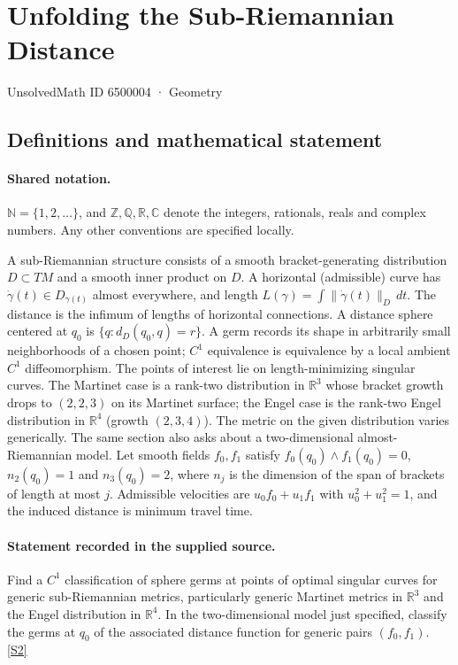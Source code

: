 \documentclass[11pt]{article}
\newcommand{\sref}[2]{\hyperlink{source:#1:#2}{[S#2]}}
\begin{document}
\setcounter{section}{6500003}
\section{Unfolding the Sub-Riemannian Distance}\label{6500004}
{\small\sffamily UnsolvedMath ID 6500004 · Geometry}
\subsection{Definitions and mathematical statement}

\paragraph{Shared notation.}$\mathbb N=\{1,2,\ldots\}$, and $\mathbb Z,\mathbb Q,\mathbb R,\mathbb C$ denote the integers, rationals, reals and complex numbers. Any other conventions are specified locally.


A sub-Riemannian structure consists of a smooth bracket-generating distribution $D\subset TM$ and a smooth inner product on $D$. A horizontal (admissible) curve has $\dot\gamma(t)\in D_{\gamma(t)}$ almost everywhere, and length $L(\gamma)=\int\|\dot\gamma(t)\|_D\,dt$. The distance is the infimum of lengths of horizontal connections. A distance sphere centered at $q_0$ is $\{q:d_D(q_0,q)=r\}$. A germ records its shape in arbitrarily small neighborhoods of a chosen point; $C^1$ equivalence is equivalence by a local ambient $C^1$ diffeomorphism. The points of interest lie on length-minimizing singular curves. The Martinet case is a rank-two distribution in $\mathbb R^3$ whose bracket growth drops to $(2,2,3)$ on its Martinet surface; the Engel case is the rank-two Engel distribution in $\mathbb R^4$ (growth $(2,3,4)$). The metric on the given distribution varies generically.
The same section also asks about a two-dimensional almost-Riemannian model. Let smooth fields $f_0,f_1$ satisfy $f_0(q_0)\wedge f_1(q_0)=0$, $n_2(q_0)=1$ and $n_3(q_0)=2$, where $n_j$ is the dimension of the span of brackets of length at most $j$. Admissible velocities are $u_0f_0+u_1f_1$ with $u_0^2+u_1^2=1$, and the induced distance is minimum travel time.
\paragraph{Statement recorded in the supplied source.}
Find a $C^1$ classification of sphere germs at points of optimal singular curves for generic sub-Riemannian metrics, particularly generic Martinet metrics in $\mathbb R^3$ and the Engel distribution in $\mathbb R^4$. In the two-dimensional model just specified, classify the germs at $q_0$ of the associated distance function for generic pairs $(f_0,f_1)$. \sref{6500004}{2}
\end{document}
